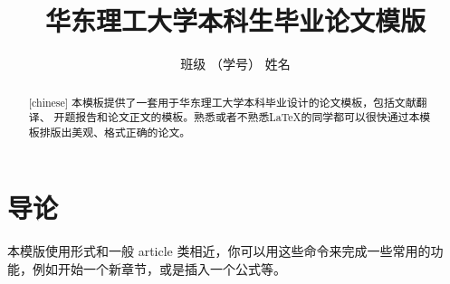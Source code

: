 \documentclass[openning]{ecustthesis}
\author{班级 （学号） 姓名}
\title{华东理工大学本科生毕业论文模版}
\begin{document}
\begin{abstract}[chinese]
本模板提供了一套用于华东理工大学本科毕业设计的论文模板，包括文献翻译、
开题报告和论文正文的模板。熟悉或者不熟悉\LaTeX 的同学都可以很快通过本模
板排版出美观、格式正确的论文。
\end{abstract}

\section{导论}

本模版使用形式和一般 article 类相近，你可以用这些命令来完成一些常用的功
能，例如开始一个新章节，或是插入一个公式等。
  
\end{document}
